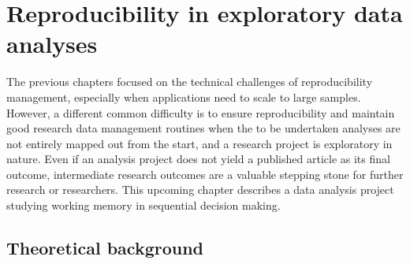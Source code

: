 

\chapter{Reproducibility in exploratory data analyses}
\label{k5}

The previous chapters focused on the technical challenges of reproducibility management, especially when applications need to scale to large samples.
However, a different common difficulty is to ensure reproducibility and maintain good research data management routines when the to be undertaken analyses are not entirely mapped out from the start, and a research project is exploratory in nature.
Even if an analysis project does not yield a published article as its final outcome, intermediate research outcomes are a valuable stepping stone for further research or researchers.
This upcoming chapter describes a data analysis project studying working memory in sequential decision making.

\section{Theoretical background}


